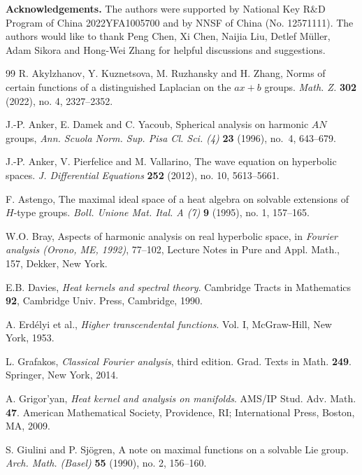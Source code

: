 \documentclass[a4paper,12pt]{amsart}
\numberwithin{equation}{section}
\theoremstyle{definition}
\theoremstyle{remark}
\numberwithin{theorem}{section}
\begin{document}


\smallskip\noindent
\textbf{Acknowledgements.} The authors were supported by National Key R$\&$D Program of China 2022YFA1005700 and 
by NNSF of China (No. 12571111). The authors would like to thank Peng Chen, Xi Chen, Naijia Liu, Detlef M\"{u}ller, Adam Sikora and Hong-Wei Zhang for helpful discussions and suggestions.




\smallskip

\begin{thebibliography}{99}
R. Akylzhanov, Y. Kuznetsova, M. Ruzhansky and H. Zhang, Norms of certain functions of a distinguished Laplacian on the $ax+b$ groups. \textit{Math. Z.} \textbf{302} (2022), no. 4, 2327--2352.

J.-P. Anker, E. Damek and C. Yacoub, Spherical analysis on harmonic $AN$ groups, \textit{Ann. Scuola Norm. Sup. Pisa Cl. Sci. (4)} \textbf{23} (1996), no.~4, 643--679.

J.-P. Anker, V. Pierfelice and M. Vallarino, The wave equation on hyperbolic spaces. \textit{J. Differential Equations} \textbf{252} (2012), no. 10, 5613--5661.

F. Astengo, The maximal ideal space of a heat algebra on solvable extensions of $H$-type groups. \textit{Boll. Unione Mat. Ital. A (7)} \textbf{9} (1995), no. 1, 157--165.

W.O. Bray, Aspects of harmonic analysis on real hyperbolic space, in \textit{Fourier analysis (Orono, ME, 1992)}, 77--102, Lecture Notes in Pure and Appl. Math., 157, Dekker, New York.

E.B. Davies, \textit{Heat kernels and spectral theory}. Cambridge Tracts in Mathematics \textbf{92}, Cambridge Univ. Press, Cambridge, 1990.

A. Erd\'{e}lyi et al., \textit{Higher transcendental functions}. Vol. I, McGraw-Hill, New York, 1953.

L. Grafakos, \textit{Classical Fourier analysis}, third edition. Grad. Texts in Math. \textbf{249}. Springer, New York, 2014.

A. Grigor'yan, \textit{Heat kernel and analysis on manifolds}. AMS/IP Stud. Adv. Math. \textbf{47}. American Mathematical Society, Providence, RI; International Press, Boston, MA, 2009.

S. Giulini and P. Sj\"{o}gren, A note on maximal functions on a solvable Lie group. \textit{Arch. Math. (Basel)} \textbf{55} (1990), no. 2, 156--160.


\end{thebibliography}
\end{document}
